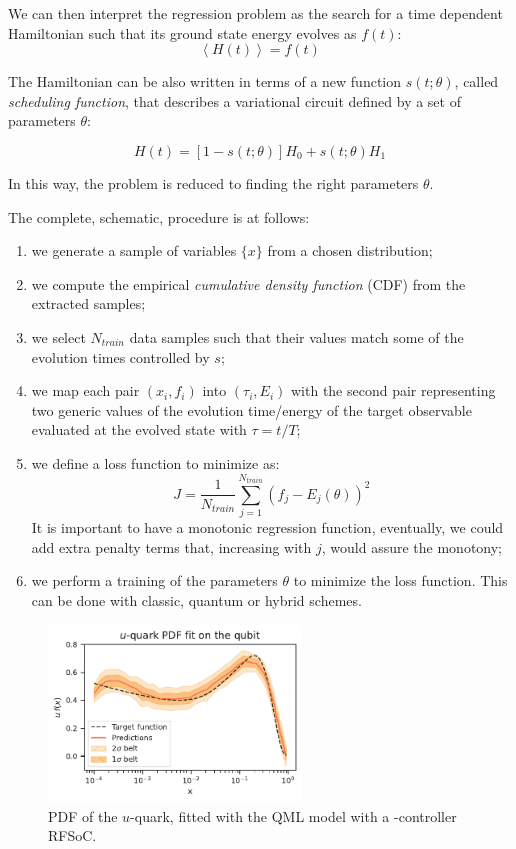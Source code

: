 We can then interpret the regression problem as the search for a time dependent Hamiltonian such that its ground state energy evolves as $f(t)$:
\begin{equation}
    \left< H(t) \right> = f(t)
\end{equation}

The Hamiltonian can be also written in terms of a new function $s(t; \theta)$, called \textit{scheduling function}, that describes a variational circuit defined by a set of parameters $\theta$:

\begin{equation}
    H(t) = [1 - s(t; \theta)]H_0 + s(t;\theta) H_1
\end{equation}

In this way, the problem is reduced to finding the right parameters $\theta$.

The complete, schematic, procedure is at follows:

\begin{enumerate}
    \item we generate a sample of variables $\{x\}$ from a chosen distribution;
    \item we compute the empirical \textit{cumulative density function} (CDF) from the extracted samples;
    \item we select $N_{train}$ data samples such that their values match some of the evolution times controlled by $s$;
    \item we map each pair $(x_i, f_i)$ into $(\tau_i, E_i)$ with the second pair representing two generic values of the evolution time/energy of the target observable evaluated at the evolved state with $\tau = t/T$;
    \item we define a loss function to minimize as:
        \begin{equation}
            J = \frac{1}{N_{train}} \sum_{j=1}^{N_{train}} (f_j - E_j (\theta))^2
        \end{equation}
        It is important to have a monotonic regression function, eventually, we could add extra penalty terms that, increasing with $j$, would assure the monotony; 
    \item we perform a training of the parameters $\theta$ to minimize the loss function. This can be done with classic, quantum or hybrid schemes.
\end{enumerate}

\begin{figure}[ht]
    \centering
    \includegraphics[width=0.6\textwidth]{Other sections/figures/qpdf.pdf}
    \caption{PDF of the $u$-quark, fitted with the QML model with a \Qibosoq-controller RFSoC.}
    \label{fig:updf}
\end{figure}

